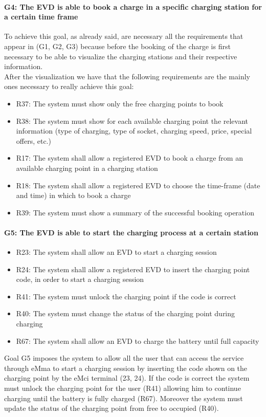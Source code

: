 \paragraph{G4: The EVD is able to book a charge in a specific charging station for a certain time frame}
To achieve this goal, as already said, are necessary all the requirements that appear in (G1, G2, G3) because before the booking of the charge is first necessary to be able to visualize the charging stations and their respective information.\\
After the visualization we have that the following requirements are the mainly ones necessary to really achieve this goal:
\begin{itemize}
    \item R37: The system must show only the free charging points to book
    \item R38: The system must show for each available charging point the relevant information (type of charging, type of socket, charging speed, price, special offers, etc.)
    \item R17: The system shall allow a registered EVD to book a charge from an available charging point in a charging station
    \item R18: The system shall allow a registered EVD to choose the time-frame (date and time) in which to book a charge
    \item R39: The system must show a summary of the successful booking operation
\end{itemize}

\paragraph{G5: The EVD is able to start the charging process at a certain station}
\begin{itemize}
    \item R23: The system shall allow an EVD to start a charging session
    \item R24: The system shall allow a registered EVD to insert the charging point code, in order to start a charging session
    \item R41: The system must unlock the charging point if the code is correct
    \item R40: The system must change the status of the charging point during charging
    \item R67: The system shall allow an EVD to charge the battery until full capacity
\end{itemize}
Goal G5 imposes the system to allow all the user that can access the service through eMma to start a charging session by inserting the code shown on the charging point by the eMci terminal (23, 24). If the code is correct the system must unlock the charging point for the user (R41) allowing him to continue charging until the battery is fully charged (R67). Moreover the system must update the status of the charging point from free to occupied (R40).


